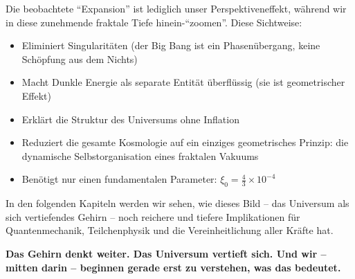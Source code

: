 \documentclass[12pt,a4paper]{article}
\begin{document}
Die beobachtete ``Expansion'' ist lediglich unser Perspektiveneffekt, während wir in diese zunehmende fraktale Tiefe hinein-``zoomen''. Diese Sichtweise:

\begin{itemize}[leftmargin=*]
\item Eliminiert Singularitäten (der Big Bang ist ein Phasenübergang, keine Schöpfung aus dem Nichts)
\item Macht Dunkle Energie als separate Entität überflüssig (sie ist geometrischer Effekt)
\item Erklärt die Struktur des Universums ohne Inflation
\item Reduziert die gesamte Kosmologie auf ein einziges geometrisches Prinzip: die dynamische Selbstorganisation eines fraktalen Vakuums
\item Benötigt nur einen fundamentalen Parameter: $\xi_0 = \frac{4}{3} \times 10^{-4}$
\end{itemize}

In den folgenden Kapiteln werden wir sehen, wie dieses Bild -- das Universum als sich vertiefendes Gehirn -- noch reichere und tiefere Implikationen für Quantenmechanik, Teilchenphysik und die Vereinheitlichung aller Kräfte hat.

\textbf{Das Gehirn denkt weiter. Das Universum vertieft sich. Und wir -- mitten darin -- beginnen gerade erst zu verstehen, was das bedeutet.}
\end{document}
